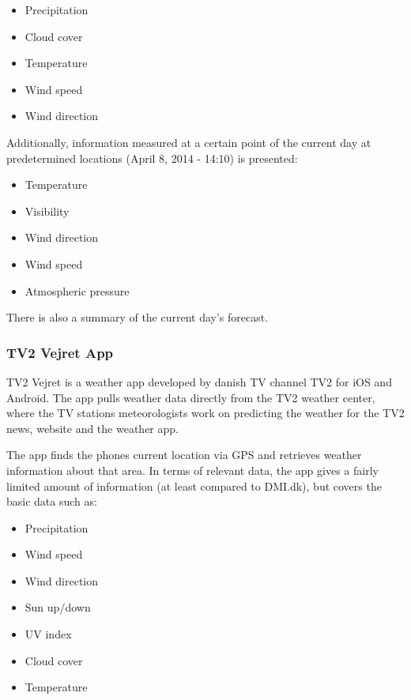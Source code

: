 \begin{itemize}
    \item Precipitation
    \item Cloud cover
    \item Temperature
    \item Wind speed
    \item Wind direction
\end{itemize}

Additionally, information measured at a certain point of the current day at predetermined locations (April 8, 2014 - 14:10) is presented:

\begin{itemize}
    \item Temperature
    \item Visibility
    \item Wind direction
    \item Wind speed
    \item Atmospheric pressure
\end{itemize}

There is also a summary of the current day’s forecast.


\FloatBarrier
\subsubsection*{TV2 Vejret App} %
\label{ssub:tv2_vejret_app}

TV2 Vejret is a weather app developed by danish TV channel TV2 for iOS and Android. 
The app pulls weather data directly from the TV2 weather center, where the TV stations meteorologists work on predicting the weather for the TV2 news, website and the weather app.


The app finds the phones current location via GPS and retrieves weather information about that area. 
In terms of relevant data, the app gives a fairly limited amount of information (at least compared to DMI.dk), but covers the basic data such as:

\begin{itemize}
    \item Precipitation
    \item Wind speed
    \item Wind direction
    \item Sun up/down
    \item UV index
    \item Cloud cover
    \item Temperature
\end{itemize} 

